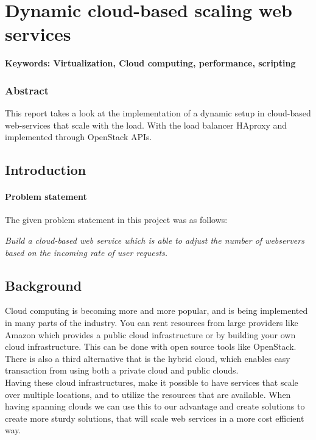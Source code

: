 \chapter{Dynamic cloud-based scaling web services}
\textbf{Keywords: Virtualization, Cloud computing, performance, scripting}

\subsection*{Abstract}

This report takes a look at the implementation of a dynamic setup in cloud-based
web-services that scale with the load. With the load balancer HAproxy and
implemented through OpenStack APIs.

\section{Introduction}

\subsubsection{Problem statement}

The given problem statement in this project was as follows:

\emph{Build a cloud-based web service which is able to adjust the number of
webservers based on the incoming rate of user requests.}

\section{Background}
Cloud computing is becoming more and more popular, and is being implemented
in many parts of the industry. You can rent resources from large providers like
Amazon which provides a public cloud infrastructure or by building your own
cloud infrastructure. This can be done with open source tools like OpenStack.
There is also a third alternative that is the hybrid cloud, which enables easy
transaction from using both a private cloud and public clouds.\\

Having these cloud infrastructures, make it possible to have services
that scale over multiple locations, and to utilize the resources that are
available. When having spanning clouds we can use this to our advantage 
and create solutions to create more sturdy solutions, that will scale web
services in a more cost efficient way.\\

